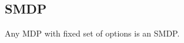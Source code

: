 \subsection{SMDP}

\begin{frame}{}
    Any MDP with fixed set of options is an SMDP.
\end{frame}



